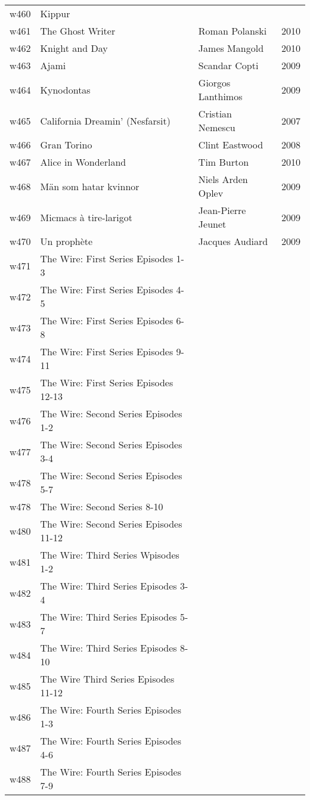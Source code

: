 \documentclass{article}
\begin{document}
\begin {center}
\begin{longtable}{l p{10cm} l l}
w460 & Kippur &  &  \\
w461 & The Ghost Writer & Roman Polanski & 2010 \\
w462 & Knight and Day & James Mangold & 2010 \\
w463 & Ajami & Scandar Copti & 2009 \\
w464 & Kynodontas & Giorgos Lanthimos & 2009 \\
w465 & California Dreamin' (Nesfarsit) & Cristian Nemescu & 2007 \\
w466 & Gran Torino & Clint Eastwood & 2008 \\
w467 & Alice in Wonderland & Tim Burton & 2010 \\
w468 & Män som hatar kvinnor & Niels Arden Oplev & 2009 \\
w469 & Micmacs à tire-larigot & Jean-Pierre Jeunet & 2009 \\
w470 & Un prophète & Jacques Audiard & 2009 \\
w471 & The Wire: First Series Episodes 1-3 &  &  \\
w472 & The Wire: First Series Episodes 4-5 &  &  \\
w473 & The Wire: First Series Episodes 6-8 &  &  \\
w474 & The Wire: First Series Episodes 9-11 &  &  \\
w475 & The Wire: First Series Episodes 12-13 &  &  \\
w476 & The Wire: Second Series Episodes 1-2 &  &  \\
w477 & The Wire: Second Series Episodes 3-4 &  &  \\
w478 & The Wire: Second Series Episodes 5-7 &  &  \\
w478 & The Wire: Second Series 8-10 &  &  \\
w480 & The Wire: Second Series Episodes 11-12 &  &  \\
w481 & The Wire: Third Series Wpisodes 1-2 &  &  \\
w482 & The Wire: Third Series Episodes 3-4 &  &  \\
w483 & The Wire: Third Series Episodes 5-7 &  &  \\
w484 & The Wire: Third Series Episodes 8-10 &  &  \\
w485 & The Wire Third Series Episodes 11-12 &  &  \\
w486 & The Wire: Fourth Series Episodes 1-3 &  &  \\
w487 & The Wire: Fourth Series Episodes 4-6 &  &  \\
w488 & The Wire: Fourth Series Episodes 7-9 &  &  \\

\end{longtable}
\end{center}
\end{document}
